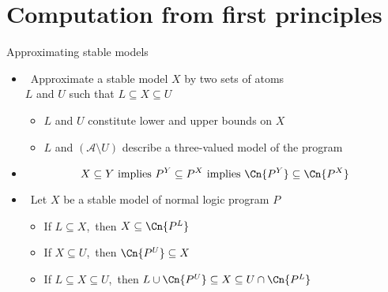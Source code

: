 \section{Computation from first principles}
\begin{frame}{Approximating stable models}
  \medskip
  \begin{itemize}
  \item<1->  \ Approximate a stable model $X$ by two sets of atoms\\
    $L$ and $U$ such that
    \(
    L\subseteq X\subseteq U
    \)
    \begin{itemize}
    \item  $L$ and $U$ constitute lower and upper bounds on $X$
    \item  $L$ and $(\mathcal{A}\setminus U)$ describe a three-valued model of the program
    \end{itemize}
    \smallskip
  \item<2-> 
    \[
    X\subseteq Y
    \text{ implies }
    P^Y\subseteq P^X
    \text{ implies }
    \Cn{P^Y}\subseteq\Cn{P^X}
    \]
  \item<3->  \
    Let $X$ be a stable model of normal logic program $P$
    \begin{itemize}\itemsep .5ex
    \item<4-> If $L\subseteq X$,\pause[5]\
      then $X\subseteq\Cn{P^L}$
    \item<6-> If $X\subseteq U$,\pause[7]\
      then $\Cn{P^U}\subseteq X$
    \item<8-> If $L\subseteq X\subseteq U$,\pause[9]\
      then $L\cup\Cn{P^U}\subseteq X\subseteq U\cap\Cn{P^L}$
    \end{itemize}
  \end{itemize}
\end{frame}
